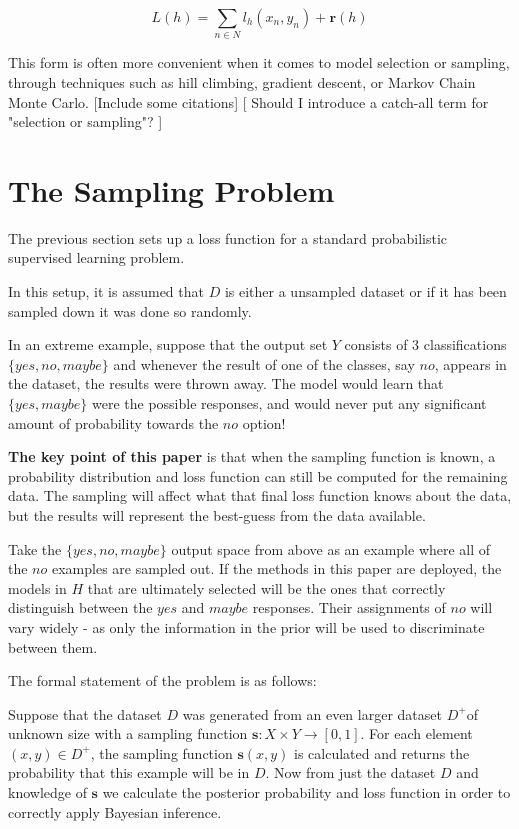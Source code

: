 \documentclass[twoside]{article}
\begin{document}
\[L(h)=\sum_{n \in N} l_h(x_n,y_n)+\mathbf{r}(h)\]

This form is often more convenient when it comes to model selection or sampling, through techniques such as hill climbing, gradient descent, or Markov Chain Monte Carlo. [Include some citations]
[ Should I introduce a catch-all term for "selection or sampling"? ]

\section{The Sampling Problem}

The previous section sets up a loss function for a standard probabilistic supervised learning problem.

In this setup, it is assumed that \(D\) is either a unsampled dataset or if it has been sampled down it was done so randomly.

In an extreme example, suppose that the output set \(Y\) consists of 3 classifications \(\{yes, no, maybe\}\) and whenever the result of one of the classes, say \(no\), appears in the dataset, the results were thrown away. The model would learn that \(\{yes, maybe\}\) were the possible responses, and would never put any significant amount of probability towards the \(no\) option!

\textbf{The key point of this paper} is that when the sampling function is known, a probability distribution and loss function can still be computed for the remaining data. The sampling will affect what that final loss function knows about the data, but the results will represent the best-guess from the data available.

Take the \(\{yes, no, maybe\}\) output space from above as an example where all of the \(no\) examples are sampled out. If the methods in this paper are deployed, the models in \(H\) that are ultimately selected will be the ones that correctly distinguish between the \(yes\) and \(maybe\) responses. Their assignments of \(no\) will vary widely - as only the information in the prior will be used to discriminate between them.

The formal statement of the problem is as follows:

Suppose that the dataset \(D\) was generated from an even larger dataset \(D^+\)of unknown size with a sampling function \(\mathbf{s}: X \times Y \rightarrow \left [ 0,1\right ]\). For each element \((x,y)\in D^+\), the sampling function \(\mathbf{s}(x,y)\) is calculated and returns the probability that this example will be in \(D\). Now from just the dataset \(D\) and knowledge of \(\mathbf{s}\) we calculate the posterior probability and loss function in order to correctly apply Bayesian inference.
\end{document}
